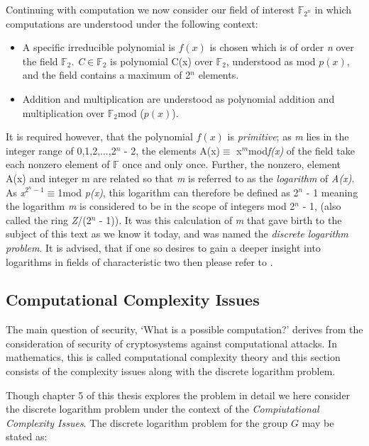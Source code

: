 \documentclass[iwp,first]{luthesis}
\begin{document}
Continuing with computation we now consider our field of interest $\mathbb{F}_{2^n}$ in which computations are understood under the following context:

\begin{itemize}

\item A specific irreducible polynomial is $f(x)$ is chosen which is of order \textit{n} over the field $\mathbb{F}_2$. \textit{C$\in\mathbb{F}_2$} is polynomial C(x) over $\mathbb{F}_2$, understood as mod $p(x)$, and the field contains a maximum of 2$^n$ elements.

\item Addition and multiplication are understood as polynomial addition and multiplication over $\mathbb{F}_2$mod ($p(x)$).

\end{itemize}

It is required however, that the polynomial $f(x)$ is \textit{primitive}; as \textit{m} lies in the integer range of 0,1,2,...,2$^n$ - 2, the elements A(x)$\equiv$ x$^m$mod\textit{f(x)} of the field take each nonzero element of $\mathbb{F}$ once and only once. Further, the nonzero, element A(x) and integer m are related so that \textit{m} is referred to as the \textit{logarithm} of \textit{A(x)}. As \textit{x}$^{2^{n} -1}\equiv$1mod \textit{p(x)}, this logarithm can therefore be defined as 2$^{n}$ - 1 meaning the logarithm \textit{m} is considered to be in the scope of integers mod 2$^n$ - 1, (also called the ring \textit{Z}/(2$^n$ - 1)). It was this calculation of \textit{m} that gave birth to the subject of this text as we know it today, and was named the \textit{discrete logarithm problem}. It is advised, that if one so desires to gain a deeper insight into logarithms in fields of characteristic two then please refer to \cite{Char2}.

\subsection{Computational Complexity Issues}

The main question of security, `What is a possible computation?' derives from the consideration of security of cryptosystems against computational attacks. In mathematics, this is called computational complexity theory and this section consists of the complexity issues along with the discrete logarithm problem. 

Though chapter 5 of this thesis explores the problem in detail we here consider the discrete logarithm problem under the context of the \textit{Compiutational Complexity Issues}. The discrete logarithm problem for the group $G$ may be stated as:
\end{document}
